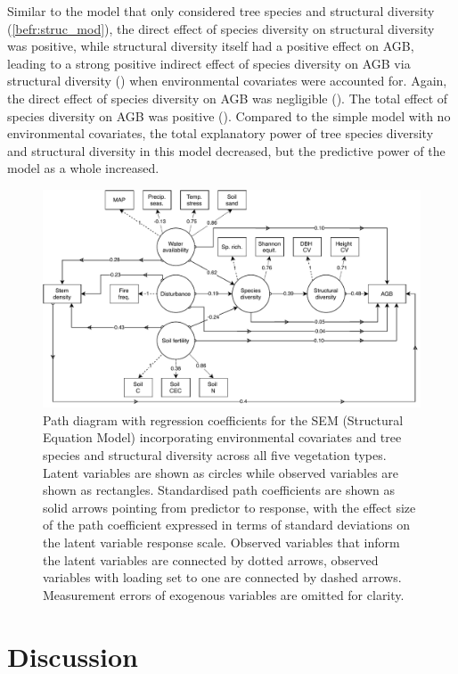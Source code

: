 \begin{refsection}
Similar to the model that only considered tree species and structural diversity (\autoref{befr:struc_mod}), the direct effect of species diversity on structural diversity was positive, while structural diversity itself had a positive effect on AGB, leading to a strong positive indirect effect of species diversity on AGB via structural diversity (\fmbetadhb{}) when environmental covariates were accounted for. Again, the direct effect of species diversity on AGB was negligible (\fmbetadb{}). The total effect of species diversity on AGB was positive (\fmbetatotaldb{}). Compared to the simple model with no environmental covariates, the total explanatory power of tree species diversity and structural diversity in this model decreased, but the predictive power of the model as a whole increased.

\begin{figure}
	\includegraphics[width=\linewidth]{img/full.drawio}
	\caption[Path diagram of full Structural Equation Model]{Path diagram with regression coefficients for the SEM (Structural Equation Model) incorporating environmental covariates and tree species and structural diversity across all five vegetation types. Latent variables are shown as circles while observed variables are shown as rectangles. Standardised path coefficients are shown as solid arrows pointing from predictor to response, with the effect size of the path coefficient expressed in terms of standard deviations on the latent variable response scale. Observed variables that inform the latent variables are connected by dotted arrows, observed variables with loading set to one are connected by dashed arrows. Measurement errors of exogenous variables are omitted for clarity.}
	\label{befr:full_mod}
\end{figure}

\section{Discussion}
\label{befr:sec:discussion}


\end{refsection}
